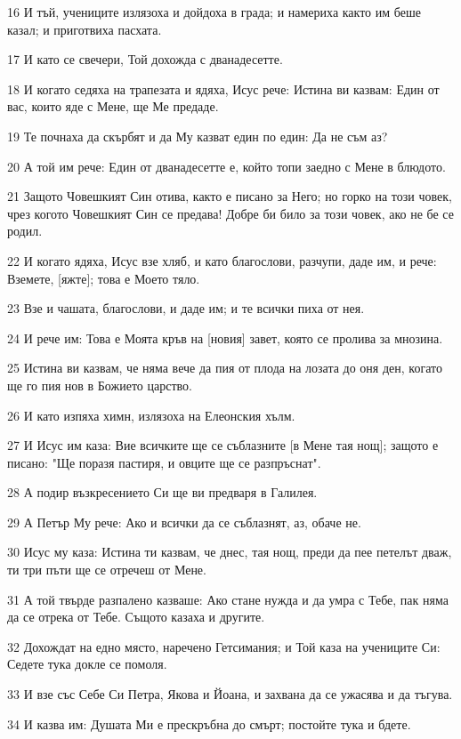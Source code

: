 \par 16 И тъй, учениците излязоха и дойдоха в града; и намериха както им беше казал; и приготвиха пасхата.
\par 17 И като се свечери, Той дохожда с дванадесетте.
\par 18 И когато седяха на трапезата и ядяха, Исус рече: Истина ви казвам: Един от вас, които яде с Мене, ще Ме предаде.
\par 19 Те почнаха да скърбят и да Му казват един по един: Да не съм аз?
\par 20 А той им рече: Един от дванадесетте е, който топи заедно с Мене в блюдото.
\par 21 Защото Човешкият Син отива, както е писано за Него; но горко на този човек, чрез когото Човешкият Син се предава! Добре би било за този човек, ако не бе се родил.
\par 22 И когато ядяха, Исус взе хляб, и като благослови, разчупи, даде им, и рече: Вземете, [яжте]; това е Моето тяло.
\par 23 Взе и чашата, благослови, и даде им; и те всички пиха от нея.
\par 24 И рече им: Това е Моята кръв на [новия] завет, която се пролива за мнозина.
\par 25 Истина ви казвам, че няма вече да пия от плода на лозата до оня ден, когато ще го пия нов в Божието царство.
\par 26 И като изпяха химн, излязоха на Елеонския хълм.
\par 27 И Исус им каза: Вие всичките ще се съблазните [в Мене тая нощ]; защото е писано: "Ще поразя пастиря, и овците ще се разпръснат".
\par 28 А подир възкресението Си ще ви предваря в Галилея.
\par 29 А Петър Му рече: Ако и всички да се съблазнят, аз, обаче не.
\par 30 Исус му каза: Истина ти казвам, че днес, тая нощ, преди да пее петелът дваж, ти три пъти ще се отречеш от Мене.
\par 31 А той твърде разпалено казваше: Ако стане нужда и да умра с Тебе, пак няма да се отрека от Тебе. Същото казаха и другите.
\par 32 Дохождат на едно място, наречено Гетсимания; и Той каза на учениците Си: Седете тука докле се помоля.
\par 33 И взе със Себе Си Петра, Якова и Йоана, и захвана да се ужасява и да тъгува.
\par 34 И казва им: Душата Ми е прескръбна до смърт; постойте тука и бдете.
